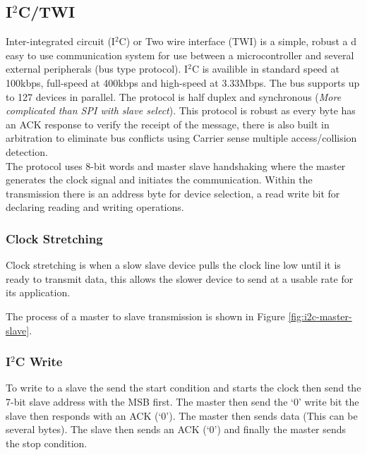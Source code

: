 

\subsection{I$^2$C/TWI}
Inter-integrated circuit (I$^2$C) or Two wire interface (TWI) is a simple, robust a d easy to use
communication system for use between a microcontroller and several external peripherals (bus type
protocol). I$^2$C is availible in standard speed at 100kbps, full-speed at 400kbps and high-speed
at 3.33Mbps. The bus supports up to 127 devices in parallel. The protocol is half duplex and
synchronous (\textit{More complicated than SPI with slave select}). This protocol is robust as every
byte has an ACK response to verify the receipt of the message, there is also built in arbitration to
eliminate bus conflicts using Carrier sense multiple access/collision detection.\\

\noindent The protocol uses 8-bit words and master slave handshaking where the master generates the clock
signal and initiates the communication. Within the transmission there is an address byte for device
selection, a read write bit for declaring reading and writing operations.\\

\subsubsection{Clock Stretching}
Clock stretching is when a slow slave device pulls the clock line low until it is ready to transmit
data, this allows the slower device to send at a usable rate for its application.



The process of a master to slave transmission is shown in Figure \ref{fig:i2c-master-slave}.



\subsubsection{I$^2$C Write}
To write to a slave the send the start condition and starts the clock then send the 7-bit slave
address with the MSB first. The master then send the `0' write bit the slave then responds with an
ACK (`0'). The master then sends data (This can be several bytes). The slave then sends an ACK (`0')
and finally the master sends the stop condition.

